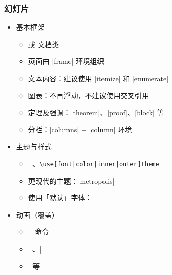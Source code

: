 \begin{frame}[fragile]
\frametitle{幻灯片}
\begin{itemize}
  \item<+-> 基本框架

    \begin{itemize}
      \item {} 或  文档类
      \item 页面由 |frame| 环境组织
      \item 文本内容：建议使用 |itemize| 和 |enumerate|
      \item 图表：不再浮动，不建议使用交叉引用
      \item 定理及强调：|theorem|、|proof|、|block| 等
      \item 分栏：|columns| + |column| 环境
    \end{itemize}

  \item<+-> 主题与样式

    \begin{itemize}
      \item |\usetheme|、\lstinline[style=style@inline]+\use[font|color|inner|outer]theme+
      \item 更现代的主题：|metropolis|
      \item 使用「默认」字体：||
    \end{itemize}

  \item<+-> 动画（覆盖）

    \begin{itemize}
      \item |\pause| 命令
      \item ||、|\item<1+>| 等
    \end{itemize}
\end{itemize}
\end{frame}
